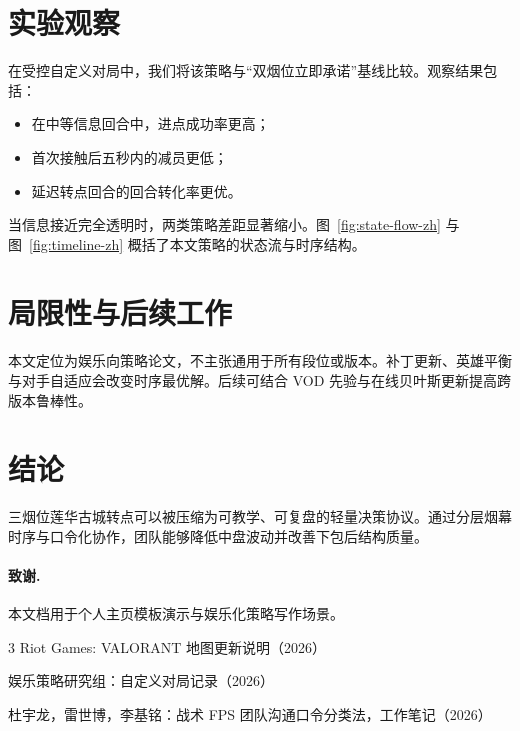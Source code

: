 \documentclass[runningheads]{llncs}
\begin{document}
\section{实验观察}
在受控自定义对局中，我们将该策略与“双烟位立即承诺”基线比较。观察结果包括：
\begin{itemize}
\item 在中等信息回合中，进点成功率更高；
\item 首次接触后五秒内的减员更低；
\item 延迟转点回合的回合转化率更优。
\end{itemize}
当信息接近完全透明时，两类策略差距显著缩小。图~\ref{fig:state-flow-zh} 与图~\ref{fig:timeline-zh} 概括了本文策略的状态流与时序结构。

\section{局限性与后续工作}
本文定位为娱乐向策略论文，不主张通用于所有段位或版本。补丁更新、英雄平衡与对手自适应会改变时序最优解。后续可结合 VOD 先验与在线贝叶斯更新提高跨版本鲁棒性。

\section{结论}
三烟位莲华古城转点可以被压缩为可教学、可复盘的轻量决策协议。通过分层烟幕时序与口令化协作，团队能够降低中盘波动并改善下包后结构质量。

\paragraph{致谢.}
本文档用于个人主页模板演示与娱乐化策略写作场景。

\begin{thebibliography}{3}
Riot Games: VALORANT 地图更新说明（2026）

娱乐策略研究组：自定义对局记录（2026）

杜宇龙，雷世博，李基铭：战术 FPS 团队沟通口令分类法，工作笔记（2026）
\end{thebibliography}
\end{document}
